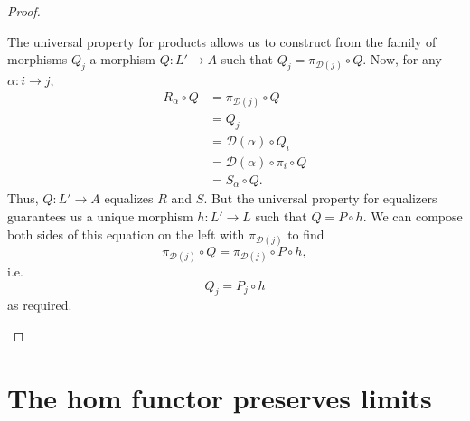 \documentclass[notes.tex]{subfiles}
\begin{document}
\begin{proof}
\begin{enumerate}
      The universal property for products allows us to construct from the family of morphisms $Q_{j}$ a morphism $Q\colon L' \to A$ such that $Q_{j} = \pi_{\mathcal{D}(j)} \circ Q$. Now, for any $\alpha\colon i \to j$,
      \begin{align*}
        R_{\alpha} \circ Q &= \pi_{\mathcal{D}(j)} \circ Q \\
        &= Q_{j} \\
        &= \mathcal{D}(\alpha) \circ Q_{i} \\
        &= \mathcal{D}(\alpha) \circ \pi_{i} \circ Q \\
        &= S_{\alpha} \circ Q.
      \end{align*}
      Thus, $Q\colon L' \to A$ equalizes $R$ and $S$. But the universal property for equalizers guarantees us a unique morphism $h\colon L' \to L$ such that $Q = P \circ h$. We can compose both sides of this equation on the left with $\pi_{\mathcal{D}(j)}$ to find
      \begin{equation*}
        \pi_{\mathcal{D}(j)} \circ Q = \pi_{\mathcal{D}(j)} \circ P \circ h,
      \end{equation*}
      i.e.
      \begin{equation*}
        Q_{j} = P_{j} \circ h
      \end{equation*}
      as required.
  \end{enumerate}
\end{proof}


\section{The hom functor preserves limits}
\end{document}
